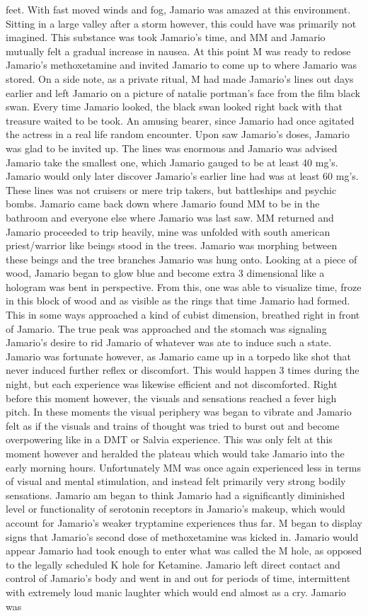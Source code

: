 \documentclass[12pt]{book}
\begin{document}
feet. With fast moved winds and fog, Jamario was amazed at this environment. Sitting in a large valley after a storm however, this could have was primarily not imagined. This substance was took Jamario's time, and MM and Jamario mutually felt a gradual increase in nausea. At this point M was ready to redose Jamario's methoxetamine and invited Jamario to come up to where Jamario was stored. On a side note, as a private ritual, M had made Jamario's lines out days earlier and left Jamario on a picture of natalie portman's face from the film black swan. Every time Jamario looked, the black swan looked right back with that treasure waited to be took. An amusing bearer, since Jamario had once agitated the actress in a real life random encounter. Upon saw Jamario's doses, Jamario was glad to be invited up. The lines was enormous and Jamario was advised Jamario take the smallest one, which Jamario gauged to be at least 40 mg's. Jamario would only later discover Jamario's earlier line had was at least 60 mg's. These lines was not cruisers or mere trip takers, but battleships and psychic bombs. Jamario came back down where Jamario found MM to be in the bathroom and everyone else where Jamario was last saw. MM returned and Jamario proceeded to trip heavily, mine was unfolded with south american priest/warrior like beings stood in the trees. Jamario was morphing between these beings and the tree branches Jamario was hung onto. Looking at a piece of wood, Jamario began to glow blue and become extra 3 dimensional like a hologram was bent in perspective. From this, one was able to visualize time, froze in this block of wood and as visible as the rings that time Jamario had formed. This in some ways approached a kind of cubist dimension, breathed right in front of Jamario. The true peak was approached and the stomach was signaling Jamario's desire to rid Jamario of whatever was ate to induce such a state. Jamario was fortunate however, as Jamario came up in a torpedo like shot that never induced further reflex or discomfort. This would happen 3 times during the night, but each experience was likewise efficient and not discomforted. Right before this moment however, the visuals and sensations reached a fever high pitch. In these moments the visual periphery was began to vibrate and Jamario felt as if the visuals and trains of thought was tried to burst out and become overpowering like in a DMT or Salvia experience. This was only felt at this moment however and heralded the plateau which would take Jamario into the early morning hours. Unfortunately MM was once again experienced less in terms of visual and mental stimulation, and instead felt primarily very strong bodily sensations. Jamario am began to think Jamario had a significantly diminished level or functionality of serotonin receptors in Jamario's makeup, which would account for Jamario's weaker tryptamine experiences thus far. M began to display signs that Jamario's second dose of methoxetamine was kicked in. Jamario would appear Jamario had took enough to enter what was called the M hole, as opposed to the legally scheduled K hole for Ketamine. Jamario left direct contact and control of Jamario's body and went in and out for periods of time, intermittent with extremely loud manic laughter which would end almost as a cry. Jamario was 
\end{document}
